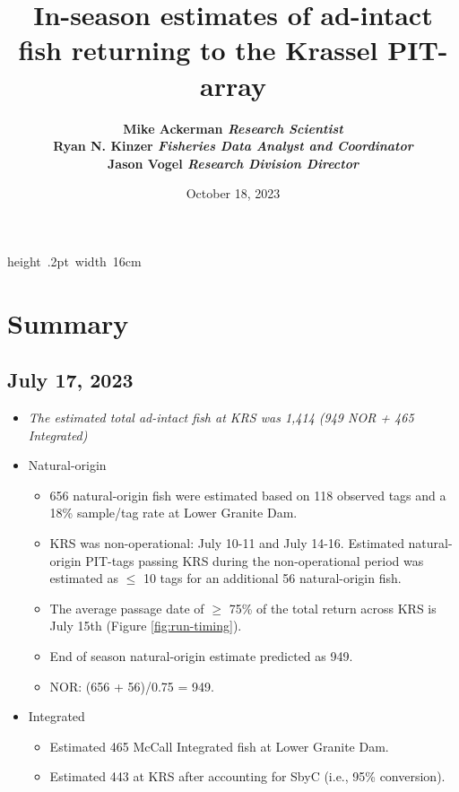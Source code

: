 \documentclass[11pt,a4paper,]{article}
\title{In-season estimates of ad-intact fish returning to the Krassel PIT-array \vspace{0.5cm}}
\author{\Large \bf{Mike Ackerman}\vspace{0.05in} \newline\normalsize\emph{Research Scientist}   \vspace{0.05in} \\ \Large \bf{Ryan N. Kinzer}\vspace{0.05in} \newline\normalsize\emph{Fisheries Data Analyst and Coordinator}   \vspace{0.05in} \\ \Large \bf{Jason Vogel}\vspace{0.05in} \newline\normalsize\emph{Research Division Director}  }
\date{October 18, 2023}
\providecommand{\tightlist}{%
  \setlength{\itemsep}{0pt}\setlength{\parskip}{0pt}}
\begin{document}
  \vspace*{-2cm}
  
  \begin{snugshade}%
  \maketitle
  \end{snugshade}\vspace*{0.5cm}

\hbox{\vrule height .2pt width 16cm}




\hypertarget{summary}{%
\section{Summary}\label{summary}}

\hypertarget{july-17-2023}{%
\subsection{July 17, 2023}\label{july-17-2023}}

\begin{itemize}
\tightlist
\item
  \emph{The estimated total ad-intact fish at KRS was 1,414 (949 NOR + 465 Integrated)}
\item
  Natural-origin

  \begin{itemize}
  \tightlist
  \item
    656 natural-origin fish were estimated based on 118 observed tags and a 18\% sample/tag rate at Lower Granite Dam.
  \item
    KRS was non-operational: July 10-11 and July 14-16. Estimated natural-origin PIT-tags passing KRS during the non-operational period was estimated as \(\le\) 10 tags for an additional 56 natural-origin fish.
  \item
    The average passage date of \(\ge\) 75\% of the total return across KRS is July 15th (Figure \ref{fig:run-timing}).
  \item
    End of season natural-origin estimate predicted as 949.
  \item
    NOR: (656 + 56)/0.75 = 949.
  \end{itemize}
\item
  Integrated

  \begin{itemize}
  \tightlist
  \item
    Estimated 465 McCall Integrated fish at Lower Granite Dam.
  \item
    Estimated 443 at KRS after accounting for SbyC (i.e., 95\% conversion).
  \end{itemize}
\end{itemize}
\end{document}
